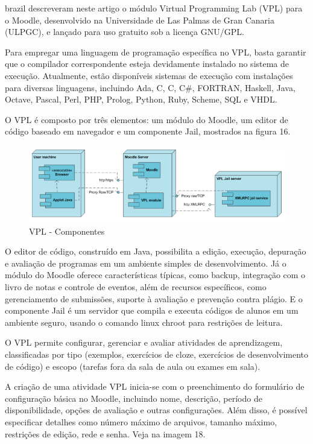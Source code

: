 \begin{otherlanguage*}{brazil}
\textcite{rodriguezdelpinoandroyo} descreveram neste artigo o módulo Virtual Programming Lab (VPL) para o Moodle, desenvolvido na Universidade de Las Palmas de Gran Canaria (ULPGC), e lançado para uso gratuito sob a licença GNU/GPL.

Para empregar uma linguagem de programação específica no VPL, basta garantir que o compilador correspondente esteja devidamente instalado no sistema de execução. Atualmente, estão disponíveis sistemas de execução com instalações para diversas linguagens, incluindo Ada, C, C\+\+, C\#, FORTRAN, Haskell, Java, Octave, Pascal, Perl, PHP, Prolog, Python, Ruby, Scheme, SQL e VHDL.
 
O VPL é composto por três elementos: um módulo do Moodle, um editor de código baseado em navegador e um componente Jail, mostrados na figura 16.

\begin{figure}[h!]
	   \centering
            \caption{VPL - Componentes}
            \label{fig:ModeloConceitual}
	   	\includegraphics[scale=0.5]{pictures/VPL_componentes.png}
\end{figure}

O editor de código, construído em Java, possibilita a edição, execução, depuração e avaliação de programas em um ambiente simples de desenvolvimento. Já o módulo do Moodle oferece características típicas, como backup, integração com o livro de notas e controle de eventos, além de recursos específicos, como gerenciamento de submissões, suporte à avaliação e prevenção contra plágio. E o componente Jail é um servidor que compila e executa códigos de alunos em um ambiente seguro, usando o comando linux chroot para restrições de leitura. 

O VPL permite configurar, gerenciar e avaliar atividades de aprendizagem, classificadas por tipo (exemplos, exercícios de cloze, exercícios de desenvolvimento de código) e escopo (tarefas fora da sala de aula ou exames em sala).

A criação de uma atividade VPL inicia-se com o preenchimento do formulário de configuração básica no Moodle, incluindo nome, descrição, período de disponibilidade, opções de avaliação e outras configurações. Além disso, é possível especificar detalhes como número máximo de arquivos, tamanho máximo, restrições de edição, rede e senha. Veja na imagem 18.


\end{otherlanguage*}
